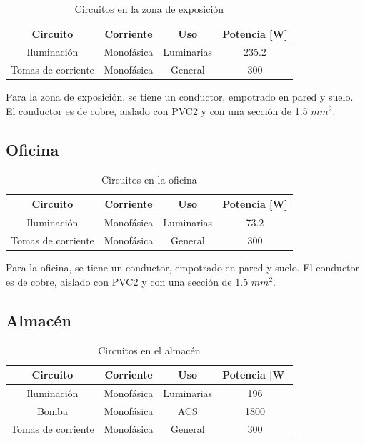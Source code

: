 \documentclass[../main.tex]{subfiles}
\begin{document}
\begin{table}[H]
    \centering
    \begin{tabular}{c|c|c|c}
        Circuito & Corriente & Uso & Potencia [W]  \\ \hline
        Iluminación & Monofásica & Luminarias & 235.2\\
        Tomas de corriente  & Monofásica & General & 300 \\
    \end{tabular}
    \caption{Circuitos en la zona de exposición} 

Para la zona de exposición, se tiene un conductor, empotrado en pared y suelo. El conductor es de cobre, aislado con PVC2 y con una sección de 1.5 $mm^2$.


\end{table}

\subsection{Oficina}

\begin{table}[H]
    \centering
    \begin{tabular}{c|c|c|c}
        Circuito & Corriente & Uso & Potencia [W]  \\ \hline
        Iluminación & Monofásica & Luminarias & 73.2 \\
        Tomas de corriente  & Monofásica & General & 300 \\

    \end{tabular}
    \caption{Circuitos en la oficina} 
\end{table}

Para la oficina, se tiene un conductor, empotrado en pared y suelo. El conductor es de cobre, aislado con PVC2 y con una sección de 1.5 $mm^2$.


\subsection{Almacén}

\begin{table}[H]
    \centering
    \begin{tabular}{c|c|c|c}
        Circuito & Corriente & Uso & Potencia [W]  \\ \hline
        Iluminación & Monofásica & Luminarias & 196 \\
        Bomba & Monofásica & ACS & 1800 \\
        Tomas de corriente  & Monofásica & General & 300 \\

    \end{tabular}
    \caption{Circuitos en el almacén} 
\end{table}
\end{document}
